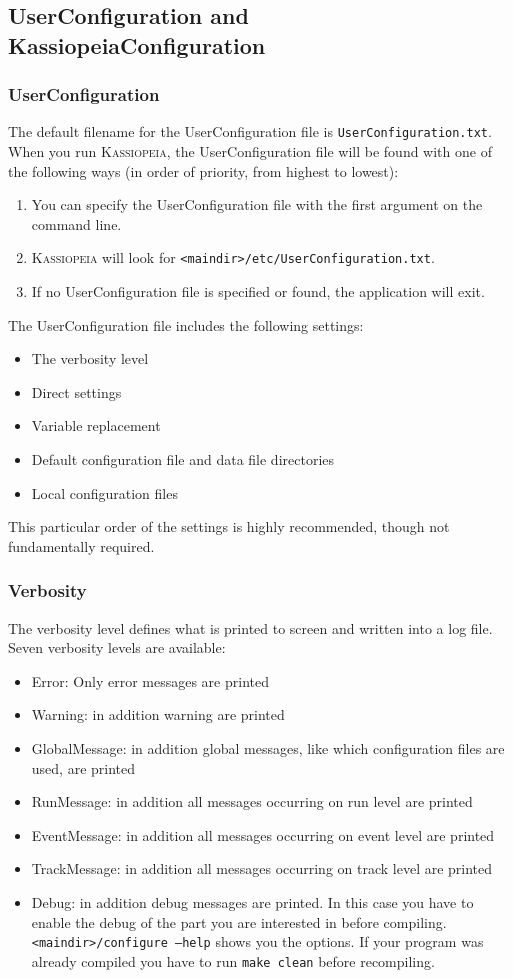 \subsection{UserConfiguration and KassiopeiaConfiguration}\label{sec:howto-userconfig}
\subsubsection{UserConfiguration}
The default filename for the UserConfiguration file is \texttt{UserConfiguration.txt}.  When you run \textsc{Kassiopeia}, the UserConfiguration file will be found with one of the following ways (in order of priority, from highest to lowest):
\begin{enumerate}
	\item You can specify the UserConfiguration file with the first argument on the command line.
	\item \textsc{Kassiopeia} will look for \texttt{<maindir>/etc/UserConfiguration.txt}.
	\item If no UserConfiguration file is specified or found, the application will exit.
\end{enumerate}

The UserConfiguration file includes the following settings: 
\begin{itemize}
	\item The verbosity level
	\item Direct settings
	\item Variable replacement
	\item Default configuration file and data file directories
	\item Local configuration files
\end{itemize}
This particular order of the settings is highly recommended, though not fundamentally required.

\subsubsection{Verbosity}
The verbosity level defines what is printed to screen and written into a log file. Seven verbosity levels are available:
\begin{itemize}
	\item Error: Only error messages are printed  
	\item Warning: in addition warning are printed  
	\item GlobalMessage: in addition global messages, like which configuration files are used, are printed
	\item RunMessage: in addition all messages occurring on run level are printed  
	\item EventMessage: in addition all messages occurring on event level are printed 
	\item TrackMessage: in addition all messages occurring on track level are printed 
	\item Debug: in addition debug messages are printed. In this case you have to enable the debug of the part you are interested in before compiling. \texttt{<maindir>/configure --help} shows you the options. If your program was already compiled you have to run \texttt{make clean} before recompiling.
\end{itemize}

